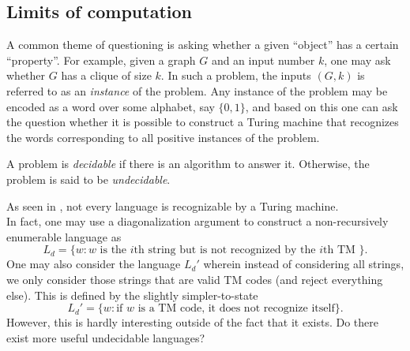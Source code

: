 \subsection{Limits of computation}
\label{subsec: limits of computation}

	A common theme of questioning is asking whether a given ``object'' has a certain ``property''. For example, given a graph $G$ and an input number $k$, one may ask whether $G$ has a clique of size $k$. In such a problem, the inputs $(G,k)$ is referred to as an \emph{instance} of the problem. Any instance of the problem may be encoded as a word over some alphabet, say $\{0,1\}$, and based on this one can ask the question whether it is possible to construct a Turing machine that recognizes the words corresponding to all positive instances of the problem.

	\begin{fdef}
		A problem is \emph{decidable} if there is an algorithm to answer it. Otherwise, the problem is said to be \emph{undecidable}.
	\end{fdef}

	As seen in , not every language is recognizable by a Turing machine.\\
	In fact, one may use a diagonalization argument to construct a non-recursively enumerable language as
	\[ L_d = \{ w : w \text{ is the $i$th string but is not recognized by the $i$th TM } \}. \]
	One may also consider the language $L_d'$ wherein instead of considering all strings, we only consider those strings that are valid TM codes (and reject everything else). This is defined by the slightly simpler-to-state
	\[ L_d' = \{ w : \text{if } w \text{ is a TM code, it does not recognize itself} \}. \]
	However, this is hardly interesting outside of the fact that it exists. Do there exist more useful undecidable languages?\\

